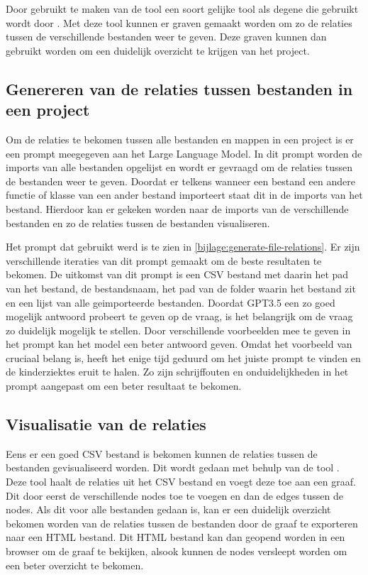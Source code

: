 Door gebruikt te maken van de tool \textcite{WHIR2018} een soort gelijke tool als degene die gebruikt wordt door \textcite{Doxygen2023}.
Met deze tool kunnen er graven gemaakt worden om zo de relaties tussen de verschillende bestanden weer te geven.
Deze graven kunnen dan gebruikt worden om een duidelijk overzicht te krijgen van het project.

\subsection{Genereren van de relaties tussen bestanden in een project}
\label{subsec:project-documentatie-relaties-genereren}

Om de relaties te bekomen tussen alle bestanden en mappen in een project is er een prompt meegegeven aan het Large Language Model.
In dit prompt worden de imports van alle bestanden opgelijst en wordt er gevraagd om de relaties tussen de bestanden weer te geven.
Doordat er telkens wanneer een bestand een andere functie of klasse van een ander bestand importeert staat dit in de imports van het bestand.
Hierdoor kan er gekeken worden naar de imports van de verschillende bestanden en zo de relaties tussen de bestanden visualiseren.

Het prompt dat gebruikt werd is te zien in \ref{bijlage:generate-file-relations}.
Er zijn verschillende iteraties van dit prompt gemaakt om de beste resultaten te bekomen.
De uitkomst van dit prompt is een CSV bestand met daarin het pad van het bestand, de bestandsnaam, het pad van de folder waarin het bestand zit en een lijst van alle geimporteerde bestanden.
Doordat GPT3.5 \autocite{OpenAI} een zo goed mogelijk antwoord probeert te geven op de vraag, is het belangrijk om de vraag zo duidelijk mogelijk te stellen.
Door verschillende voorbeelden mee te geven in het prompt kan het model een beter antwoord geven.
Omdat het voorbeeld van cruciaal belang is, heeft het enige tijd geduurd om het juiste prompt te vinden en de kinderziektes eruit te halen.
Zo zijn schrijffouten en onduidelijkheden in het prompt aangepast om een beter resultaat te bekomen.

\subsection{Visualisatie van de relaties}
\label{subsec:project-documentatie-relaties-visualisatie}

Eens er een goed CSV bestand is bekomen kunnen de relaties tussen de bestanden gevisualiseerd worden.
Dit wordt gedaan met behulp van de tool \textcite{WHIR2018}.
Deze tool haalt de relaties uit het CSV bestand en voegt deze toe aan een graaf. 
Dit door eerst de verschillende nodes toe te voegen en dan de edges tussen de nodes.
Als dit voor alle bestanden gedaan is, kan er een duidelijk overzicht bekomen worden van de relaties tussen de bestanden door de graaf te exporteren naar een HTML bestand.
Dit HTML bestand kan dan geopend worden in een browser om de graaf te bekijken, alsook kunnen de nodes versleept worden om een beter overzicht te bekomen.

